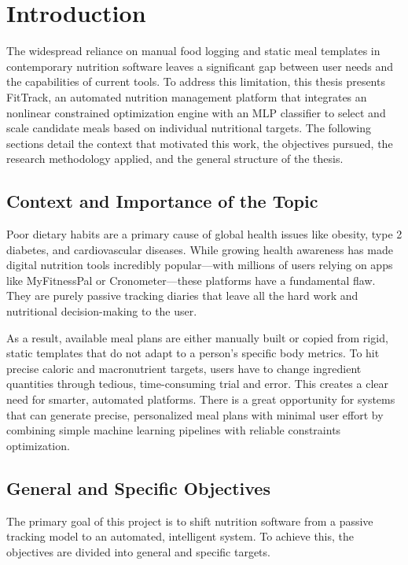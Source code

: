 \chapter{Introduction}
\label{cap:cap1}

The widespread reliance on manual food logging and static meal templates in 
contemporary nutrition software leaves a significant gap between user needs and 
the capabilities of current tools. To address this limitation, this thesis 
presents FitTrack, an automated nutrition management platform that integrates an 
nonlinear constrained optimization engine with an MLP classifier to select
and scale candidate meals based on individual nutritional targets. The following 
sections detail the context that motivated this work, the objectives pursued, the 
research methodology applied, and the general structure of the thesis.

\section{Context and Importance of the Topic}
Poor dietary habits are a primary cause of global health issues like obesity, 
type 2 diabetes, and cardiovascular diseases. While growing health awareness has 
made digital nutrition tools incredibly popular—with millions of users relying 
on apps like MyFitnessPal or Cronometer—these platforms have a fundamental flaw. 
They are purely passive tracking diaries that leave all the hard work and 
nutritional decision-making to the user. 

As a result, available meal plans are either manually built or copied from rigid, 
static templates that do not adapt to a person's specific body metrics. 
To hit precise caloric and macronutrient targets, users have to change ingredient
 quantities through tedious, time-consuming trial and error. This creates a clear 
 need for smarter, automated platforms. There is a great opportunity for systems 
 that can generate precise, personalized meal plans with minimal user effort by 
 combining simple machine learning pipelines with reliable constraints optimization.

\section{General and Specific Objectives}

The primary goal of this project is to shift nutrition software from a passive 
tracking model to an automated, intelligent system. To achieve this, the objectives 
are divided into general and specific targets.

